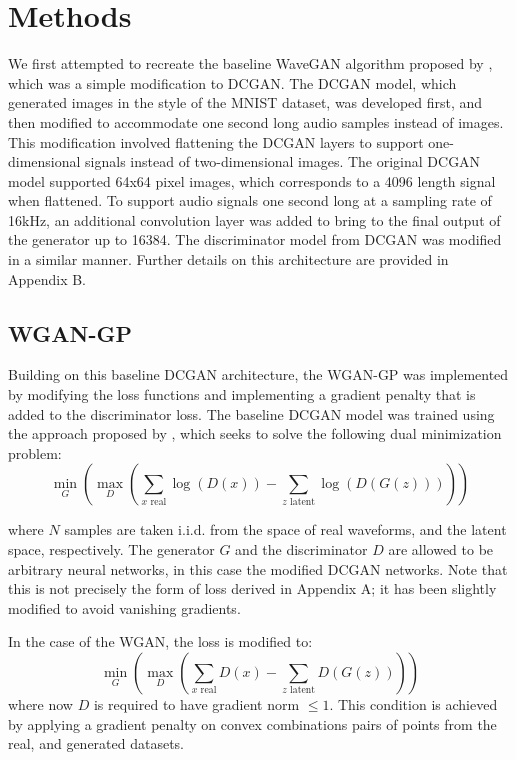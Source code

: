 \section{Methods}
We first attempted to recreate the baseline WaveGAN algorithm proposed by \cite{donahue2018adversarial}, which was a simple modification to DCGAN. The DCGAN model, which generated images in the style of the MNIST dataset, was developed first, and then modified to accommodate one second long audio samples instead of images. This modification involved flattening the DCGAN layers to support one-dimensional signals instead of two-dimensional images. The original DCGAN model supported 64x64 pixel images, which corresponds to a 4096 length signal when flattened. To support audio signals one second long at a sampling rate of 16kHz, an additional convolution layer was added to bring to the final output of the generator up to 16384. The discriminator model from DCGAN was modified in a similar manner. Further details on this architecture are provided in Appendix B.

\subsection{WGAN-GP}
Building on this baseline DCGAN architecture, the WGAN-GP was implemented by modifying the loss functions and implementing a gradient penalty that is added to the discriminator loss. The baseline DCGAN model was trained using the approach proposed by \cite{goodfellow2014generative}, which seeks to solve the following dual minimization problem:
\begin{equation*}\label{eqn:goodfellow_minimization}
    \min_{G}\left(\max_{D}\left(\sum_{x\text{ real}}\log(D(x))-\sum_{z\text{ latent}}\log(D(G(z)))\right)\right)
\end{equation*}

where $N$ samples are taken i.i.d. from the space of real waveforms, and the latent space, respectively. The generator $G$ and the discriminator $D$ are allowed to be arbitrary neural networks, in this case the modified DCGAN networks. Note that this is not precisely the form of loss derived in Appendix A; it has been slightly modified to avoid vanishing gradients.

In the case of the WGAN, the loss is modified to:
\begin{equation*}
    \min_{G}\left(\max_{D}\left(\sum_{x\text{ real}}D(x)-\sum_{z\text{ latent}}D(G(z))\right)\right)
\end{equation*}
where now $D$ is required to have gradient norm $\leq 1$. This condition is achieved by applying a gradient penalty on convex combinations pairs of points from the real, and generated datasets.

